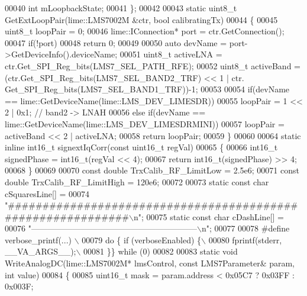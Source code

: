 \begin{DoxyCode}
00040     \textcolor{keywordtype}{int} mLoopbackState;
00041 \};
00042 
00043 \textcolor{keyword}{static} uint8\_t GetExtLoopPair(lime::LMS7002M &ctr, \textcolor{keywordtype}{bool} calibratingTx)
00044 \{
00045     uint8\_t loopPair = 0;
00046     lime::IConnection* port = ctr.GetConnection();
00047     \textcolor{keywordflow}{if}(!port)
00048         \textcolor{keywordflow}{return} 0;
00049 
00050     \textcolor{keyword}{auto} devName = port->GetDeviceInfo().deviceName;
00051     uint8\_t activeLNA = ctr.Get_SPI_Reg_bits(LMS7_SEL_PATH_RFE);
00052     uint8\_t activeBand = (ctr.Get_SPI_Reg_bits(LMS7_SEL_BAND2_TRF) << 1 | ctr.
      Get_SPI_Reg_bits(LMS7_SEL_BAND1_TRF))-1;
00053 
00054     \textcolor{keywordflow}{if}(devName == lime::GetDeviceName(lime::LMS_DEV_LIMESDR))
00055         loopPair = 1 << 2 | 0x1; \textcolor{comment}{// band2 -> LNAH}
00056     \textcolor{keywordflow}{else} \textcolor{keywordflow}{if}(devName == lime::GetDeviceName(lime::LMS_DEV_LIMESDRMINI))
00057         loopPair = activeBand << 2 | activeLNA;
00058     \textcolor{keywordflow}{return} loopPair;
00059 \}
00060 
00064 \textcolor{keyword}{static} \textcolor{keyword}{inline} int16\_t signextIqCorr(\textcolor{keyword}{const} uint16\_t regVal)
00065 \{
00066     int16\_t signedPhase = int16\_t(regVal << 4);
00067     \textcolor{keywordflow}{return} int16\_t(signedPhase) >> 4;
00068 \}
00069 
00070 \textcolor{keyword}{const} \textcolor{keywordtype}{double} TrxCalib_RF_LimitLow = 2.5e6;
00071 \textcolor{keyword}{const} \textcolor{keywordtype}{double} TrxCalib_RF_LimitHigh = 120e6;
00072 
00073 \textcolor{keyword}{static} \textcolor{keyword}{const} \textcolor{keywordtype}{char} cSquaresLine[] =
00074     \textcolor{stringliteral}{"############################################################\(\backslash\)n"};
00075 \textcolor{keyword}{static} \textcolor{keyword}{const} \textcolor{keywordtype}{char} cDashLine[] =
00076     \textcolor{stringliteral}{"------------------------------------------------------------\(\backslash\)n"};
00077 
00078 \textcolor{preprocessor}{#define verbose\_printf(...) \(\backslash\)}
00079 \textcolor{preprocessor}{    do \{ if (verboseEnabled) \{\(\backslash\)}
00080 \textcolor{preprocessor}{        fprintf(stderr, \_\_VA\_ARGS\_\_);\(\backslash\)}
00081 \textcolor{preprocessor}{    \}\} while (0)}
00082 
00083 \textcolor{keyword}{static} \textcolor{keywordtype}{void} WriteAnalogDC(lime::LMS7002M* lmsControl, \textcolor{keyword}{const} LMS7Parameter& param, \textcolor{keywordtype}{int} value)
00084 \{
00085     uint16\_t mask = param.address < 0x05C7 ? 0x03FF : 0x003F;

\end{DoxyCode}
